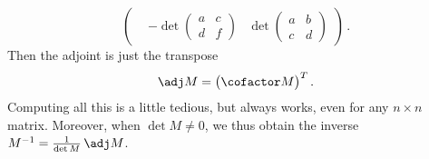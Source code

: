 {\[\begin{pmatrix}
&-\det\begin{pmatrix}a&c\\d&f\end{pmatrix}
&\det\begin{pmatrix}a&b\\c&d\end{pmatrix}
\end{pmatrix}\, .
\]
Then the adjoint is just the transpose
\[
\adj M=\big(\cofactor M\big)^T\, .
\]
Computing all this is a little tedious, but always works, even for any $n\times n$ matrix.
Moreover, when $\det M \neq 0$, we thus obtain the inverse
$
M^{-1}=\frac{1}{\det M}\, \adj M
$.


}

\newpage
